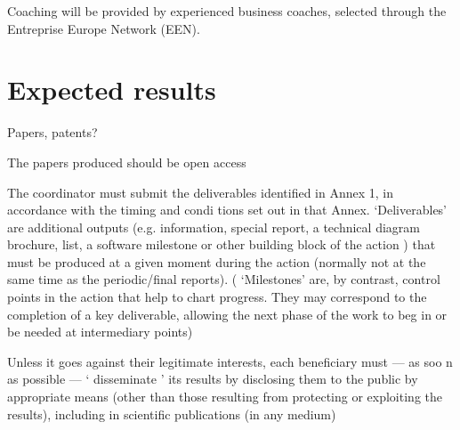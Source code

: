 \documentclass{article}
\begin{document}
Coaching will be provided by experienced business coaches, selected through the Entreprise Europe Network (EEN).

\section{Expected results}
Papers, patents?

The papers produced should be open access

The coordinator must submit the deliverables identified in Annex 1, in accordance with the timing and condi tions set out in that Annex. ‘Deliverables' are additional outputs (e.g. information, special report, a technical diagram brochure, list, a software milestone or other building block of the action ) that must be produced at a given moment during the action (normally not at the same time as the periodic/final reports). ( ‘Milestones' are, by contrast, control points in the action that help to chart progress. They may correspond to the completion of a key deliverable, allowing the next phase of the work to beg in or be needed at intermediary points)

Unless it goes against their legitimate interests, each beneficiary must — as soo	n as possible — ‘ disseminate ' its results by disclosing them to the public by appropriate means (other than those resulting from protecting or exploiting the results), including in scientific publications (in any medium)
\end{document}

